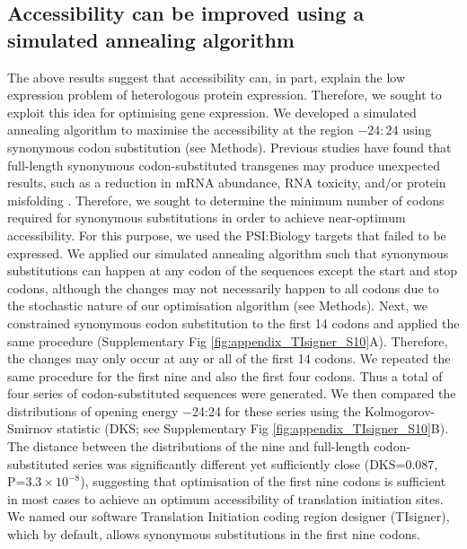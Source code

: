 \subsection{Accessibility can be improved using a simulated annealing algorithm}
The above results suggest that accessibility can, in part, explain the low expression problem of heterologous protein expression. Therefore, we sought to exploit this idea for optimising gene expression. We developed a simulated annealing algorithm to maximise the accessibility at the region $−24:24$ using synonymous codon substitution (see Methods). Previous studies have found that full-length synonymous codon-substituted transgenes may produce unexpected results, such as a reduction in mRNA abundance, RNA toxicity, and/or protein misfolding \cite{Ben-Yehezkel2015-bj,Umu2016-zq,Tunney2018-sr,Mittal2018-no}. Therefore, we sought to determine the minimum number of codons required for synonymous substitutions in order to achieve near-optimum accessibility. For this purpose, we used the PSI:Biology targets that failed to be expressed. We applied our simulated annealing algorithm such that synonymous substitutions can happen at any codon of the sequences except the start and stop codons, although the changes may not necessarily happen to all codons due to the stochastic nature of our optimisation algorithm (see Methods).  Next, we constrained synonymous codon substitution to the first 14 codons and applied the same procedure (Supplementary Fig \ref{fig:appendix_TIsigner_S10}A). Therefore, the changes may only occur at any or all of the first 14 codons. We repeated the same procedure for the first nine and also the first four codons. Thus a total of four series of codon-substituted sequences were generated. We then compared the distributions of opening energy −24:24 for these series using the Kolmogorov-Smirnov statistic (DKS; see Supplementary Fig \ref{fig:appendix_TIsigner_S10}B). The distance between the distributions of the nine and full-length codon-substituted series was significantly different yet sufficiently close (DKS=0.087, P=$3.3 \times 10^{-8}$), suggesting that optimisation of the first nine codons is sufficient in most cases to achieve an optimum accessibility of translation initiation sites. We named our software Translation Initiation coding region designer (TIsigner), which by default, allows synonymous substitutions in the first nine codons.

